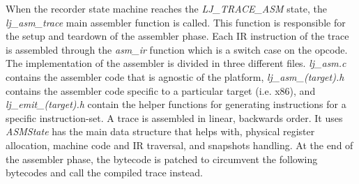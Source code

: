 
When the recorder state machine reaches the \emph{LJ\_TRACE\_ASM} state, the
\emph{lj\_asm\_trace} main assembler function is called. This function is
responsible for the setup and teardown of the assembler phase. Each IR
instruction of the trace is assembled through the \emph{asm\_ir} function which
is a switch case on the opcode. The implementation of the assembler is divided
in three different files. \emph{lj\_asm.c} contains the assembler code that is
agnostic of the platform, \emph{lj\_asm\_(target).h} contains the assembler code
specific to a particular target (i.e. x86), and \emph{lj\_emit\_(target).h}
contain the helper functions for generating instructions for a specific
instruction-set. A trace is assembled in linear, backwards order. It uses
\emph{ASMState} has the main data structure that helps with, physical register
allocation, machine code and IR traversal, and snapshots handling. At the end of
the assembler phase, the bytecode is patched to circumvent the following bytecodes
and call the compiled trace instead.

